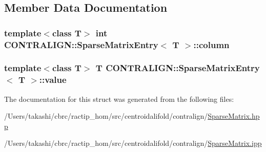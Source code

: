 \subsection{Member Data Documentation}
\hypertarget{struct_c_o_n_t_r_a_l_i_g_n_1_1_sparse_matrix_entry_a9e09b06b482fcef5e44223207aee3bea}{
\subsubsection[{column}]{\setlength{\rightskip}{0pt plus 5cm}template$<$class T$>$ int {\bf C\+O\+N\+T\+R\+A\+L\+I\+G\+N\+::\+Sparse\+Matrix\+Entry}$<$ T $>$\+::column}}\label{struct_c_o_n_t_r_a_l_i_g_n_1_1_sparse_matrix_entry_a9e09b06b482fcef5e44223207aee3bea}
\hypertarget{struct_c_o_n_t_r_a_l_i_g_n_1_1_sparse_matrix_entry_a61180da626bf3c9f525b5e6ce0af14b8}{
\subsubsection[{value}]{\setlength{\rightskip}{0pt plus 5cm}template$<$class T$>$ T {\bf C\+O\+N\+T\+R\+A\+L\+I\+G\+N\+::\+Sparse\+Matrix\+Entry}$<$ T $>$\+::value}}\label{struct_c_o_n_t_r_a_l_i_g_n_1_1_sparse_matrix_entry_a61180da626bf3c9f525b5e6ce0af14b8}


The documentation for this struct was generated from the following files\+:\begin{DoxyCompactItemize}
\item 
/\+Users/takashi/cbrc/ractip\+\_\+hom/src/centroidalifold/contralign/\hyperlink{_sparse_matrix_8hpp}{Sparse\+Matrix.\+hpp}\item 
/\+Users/takashi/cbrc/ractip\+\_\+hom/src/centroidalifold/contralign/\hyperlink{_sparse_matrix_8ipp}{Sparse\+Matrix.\+ipp}\end{DoxyCompactItemize}
